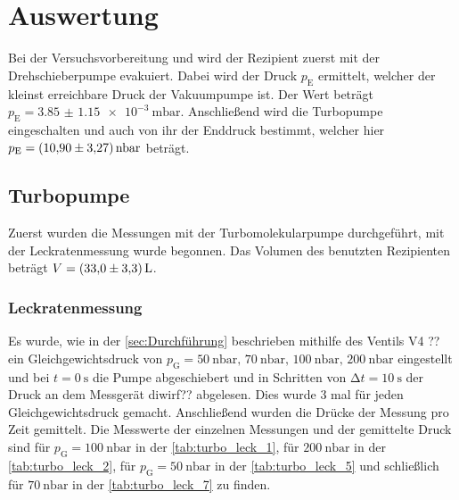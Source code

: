 \section{Auswertung}
\label{sec:Auswertung}

\noindent Bei der Versuchsvorbereitung und wird der Rezipient zuerst mit der Drehschieberpumpe evakuiert. Dabei wird der Druck $p_\text{E}$ ermittelt, welcher der kleinst erreichbare Druck 
der Vakuumpumpe ist. Der Wert beträgt $p_\text{E} = \SI{3.85(115)e-3}{\milli\bar}$. Anschließend wird die Turbopumpe eingeschalten und auch von ihr der Enddruck bestimmt, welcher hier 
$p_\text{E} = \SI{10.9 \pm 3.27}{\nano\bar}$ beträgt. 

\subsection{Turbopumpe}

  \noindent Zuerst wurden die Messungen mit der Turbomolekularpumpe durchgeführt, mit der Leckratenmessung wurde begonnen. Das Volumen des benutzten Rezipienten beträgt $V = \SI{33 \pm 3.3}{L}$. 
  
  \subsubsection{Leckratenmessung}

    \noindent Es wurde, wie in der \autoref{sec:Durchführung} beschrieben mithilfe des Ventils V4 ?? ein Gleichgewichtsdruck von $p_\text{G} = \SI{50}{\nano\bar}, \, \SI{70}{\nano\bar}, \,  \SI{100}{\nano\bar},\, \SI{200}{\nano\bar}$ eingestellt 
    und bei $t = \SI{0}{\second}$ die Pumpe abgeschiebert und in Schritten von $\increment t = \SI{10}{\second}$ der Druck an dem Messgerät diwirf?? abgelesen. Dies wurde 3 mal für jeden 
    Gleichgewichtsdruck gemacht. Anschließend wurden die Drücke der Messung pro Zeit gemittelt. Die Messwerte der einzelnen Messungen und der gemittelte Druck sind für $p_\text{G} = \SI{100}{\nano\bar}$ in der \autoref{tab:turbo_leck_1}, für 
    $\SI{200}{\nano\bar}$ in der \autoref{tab:turbo_leck_2}, für $p_\text{G} = \SI{50}{\nano\bar}$ in der \autoref{tab:turbo_leck_5} und schließlich für $\SI{70}{\nano\bar}$ in der \autoref{tab:turbo_leck_7} zu finden. 

